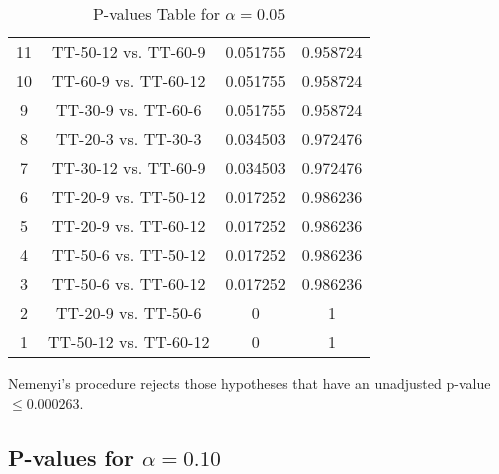 \documentclass[a4paper,10pt]{article}
\begin{document}
\begin{landscape}
\begin{table}[!htp]
\begin{tabular}{cccc}
11&TT-50-12 vs. TT-60-9&0.051755&0.958724\\
10&TT-60-9 vs. TT-60-12&0.051755&0.958724\\
9&TT-30-9 vs. TT-60-6&0.051755&0.958724\\
8&TT-20-3 vs. TT-30-3&0.034503&0.972476\\
7&TT-30-12 vs. TT-60-9&0.034503&0.972476\\
6&TT-20-9 vs. TT-50-12&0.017252&0.986236\\
5&TT-20-9 vs. TT-60-12&0.017252&0.986236\\
4&TT-50-6 vs. TT-50-12&0.017252&0.986236\\
3&TT-50-6 vs. TT-60-12&0.017252&0.986236\\
2&TT-20-9 vs. TT-50-6&0&1\\
1&TT-50-12 vs. TT-60-12&0&1\\
\hline
\end{tabular}
\caption{P-values Table for $\alpha=0.05$}
\end{table}Nemenyi's procedure rejects those hypotheses that have an unadjusted p-value $\le0.000263$.

\pagebreak

\subsection{P-values for $\alpha=0.10$}


\end{landscape}
\end{document}
